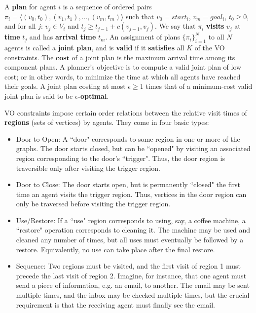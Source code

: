 \documentclass[letterpaper]{article}
\begin{document}
A \textbf{plan} for agent $i$ is a sequence of ordered pairs $\pi_i = \langle (v_0,t_0),(v_1,t_1),\ldots,(v_m,t_m) \rangle$ such that $v_0 = start_i$, $v_m = goal_i$, $t_0 \ge 0$, and for all $j$: $v_j \in V_i$ and $t_{j} \ge t_{j-1} + c(v_{j-1},v_j)$. We say that $\pi_i$ \textbf{visits} $v_j$ at \textbf{time} $t_j$ and has \textbf{arrival time} $t_m$. An assignment of plans $\{\pi_i\}_{i=1}^N$ to all $N$ agents is called a \textbf{joint plan}, and is \textbf{valid} if it \textbf{satisfies} all $K$ of the VO constraints. The $\textbf{cost}$ of a joint plan is the maximum arrival time among its component plans. A planner's objective is to compute a valid joint plan of low cost; or in other words, to minimize the time at which all agents have reached their goals. A joint plan costing at most $\epsilon \ge 1$ times that of a minimum-cost valid joint plan is said to be 
\textbf{$\epsilon$-optimal}.

VO constraints impose certain order relations between the relative visit times of \textbf{regions} (sets of vertices) by agents. They come in four basic types:

\begin{itemize}
\item Door to Open: A ``door" corresponds to some region in one or more of the graphs. The door starts closed, but can be ``opened" by visiting an associated region corresponding to the door's ``trigger". Thus, the door region is traversible only after visiting the trigger region.
\item Door to Close: The door starts open, but is permanently ``closed" the first time an agent visits the trigger region. Thus, vertices in the door region can only be traversed before visiting the trigger region.
\item Use/Restore: If a ``use" region corresponds to using, say, a coffee machine, a ``restore" operation corresponds to cleaning it. The machine may be used and cleaned any number of times, but all uses must eventually be followed by a restore. Equivalently, no use can take place after the final restore.
\item Sequence: Two regions must be visited, and the first visit of region 1 must precede the last visit of region 2. Imagine, for instance, that one agent must send a piece of information, e.g. an email, to another. The email may be sent multiple times, and the inbox may be checked multiple times, but the crucial requirement is that the receiving agent must finally see the email.
\end{itemize}
\end{document}
